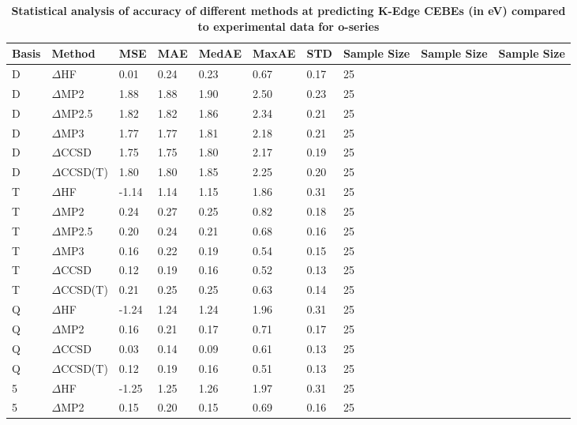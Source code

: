 \begin{table}
  \caption{\textbf{Statistical analysis of accuracy of different methods at predicting K-Edge CEBEs (in eV) compared to experimental data for o-series}}
  \label{tbl:summary-o}
  \begin{tabular}{l l l l l l l l l l }
    \hline
    \textbf{Basis} & \textbf{Method} & \textbf{MSE} & \textbf{MAE} & \textbf{MedAE} & \textbf{MaxAE} & \textbf{STD} & \textbf{Sample Size} & \textbf{Sample Size} & \textbf{Sample Size} \\ 
    \hline
    D & $\Delta$HF & 0.01 & 0.24 & 0.23 & 0.67 & 0.17 & 25 \\ 
    D & $\Delta$MP2 & 1.88 & 1.88 & 1.90 & 2.50 & 0.23 & 25 \\ 
    D & $\Delta$MP2.5 & 1.82 & 1.82 & 1.86 & 2.34 & 0.21 & 25 \\ 
    D & $\Delta$MP3 & 1.77 & 1.77 & 1.81 & 2.18 & 0.21 & 25 \\ 
    D & $\Delta$CCSD & 1.75 & 1.75 & 1.80 & 2.17 & 0.19 & 25 \\ 
    D & $\Delta$CCSD(T) & 1.80 & 1.80 & 1.85 & 2.25 & 0.20 & 25 \\ 
    T & $\Delta$HF & -1.14 & 1.14 & 1.15 & 1.86 & 0.31 & 25 \\ 
    T & $\Delta$MP2 & 0.24 & 0.27 & 0.25 & 0.82 & 0.18 & 25 \\ 
    T & $\Delta$MP2.5 & 0.20 & 0.24 & 0.21 & 0.68 & 0.16 & 25 \\ 
    T & $\Delta$MP3 & 0.16 & 0.22 & 0.19 & 0.54 & 0.15 & 25 \\ 
    T & $\Delta$CCSD & 0.12 & 0.19 & 0.16 & 0.52 & 0.13 & 25 \\ 
    T & $\Delta$CCSD(T) & 0.21 & 0.25 & 0.25 & 0.63 & 0.14 & 25 \\ 
    Q & $\Delta$HF & -1.24 & 1.24 & 1.24 & 1.96 & 0.31 & 25 \\ 
    Q & $\Delta$MP2 & 0.16 & 0.21 & 0.17 & 0.71 & 0.17 & 25 \\ 
    Q & $\Delta$CCSD & 0.03 & 0.14 & 0.09 & 0.61 & 0.13 & 25 \\ 
    Q & $\Delta$CCSD(T) & 0.12 & 0.19 & 0.16 & 0.51 & 0.13 & 25 \\ 
    5 & $\Delta$HF & -1.25 & 1.25 & 1.26 & 1.97 & 0.31 & 25 \\ 
    5 & $\Delta$MP2 & 0.15 & 0.20 & 0.15 & 0.69 & 0.16 & 25 \\ 
    \hline
  \end{tabular}
\end{table}
